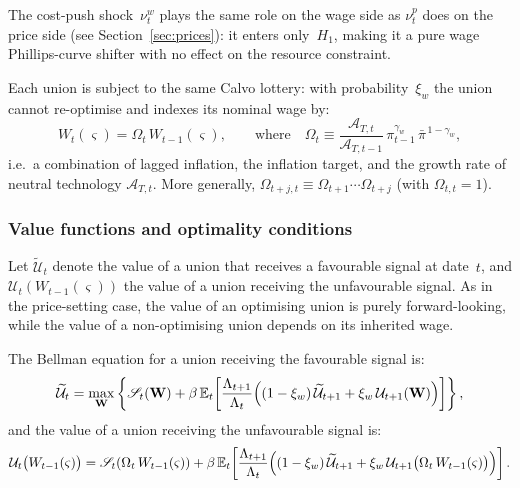 \documentclass[11pt,a4paper]{article}
\newcommand{\E}{\mathbb{E}}
\newcommand{\bbar}[1]{\bar{#1}}
\begin{document}
The cost-push shock~$\nu^w_t$ plays the same role on the wage side as
$\nu^p_t$ does on the price side (see Section~\ref{sec:prices}): it
enters only~$H_1$, making it a pure wage Phillips-curve shifter with no
effect on the resource constraint.

Each union is subject to the same Calvo lottery: with
probability~$\xi_w$ the union cannot re-optimise and indexes its nominal
wage by:
\begin{equation}\label{eq:wage_index_rule}
  W_t(\varsigma) = \Omega_t\,W_{t-1}(\varsigma),
  \qquad\text{where}\quad
  \Omega_t \equiv \frac{\mathcal{A}_{T,t}}{\mathcal{A}_{T,t-1}}\,
    \pi_{t-1}^{\gamma_w}\,\bbar\pi^{\,1-\gamma_w},
\end{equation}
i.e.\ a combination of lagged inflation, the inflation target, and the
growth rate of neutral technology $\mathcal{A}_{T,t}$. More generally,
$\Omega_{t+j,t} \equiv \Omega_{t+1}\cdots\Omega_{t+j}$ (with
$\Omega_{t,t}=1$).

\subsubsection{Value functions and optimality conditions}

Let $\widetilde{\mathcal{U}}_t$ denote the value of a union that
receives a favourable signal at date~$t$, and
$\mathcal{U}_t(W_{t-1}(\varsigma))$ the value of a union receiving the
unfavourable signal. As in the price-setting case, the value of an
optimising union is purely forward-looking, while the value of a
non-optimising union depends on its inherited wage.

The Bellman equation for a union receiving the favourable signal is:
\begin{equation}\label{eq:bellman_wage_fav}
  \widetilde{\mathcal{U}}_t
  = \max_{\mathbf{W}}\left\{
    \mathscr{S}_t(\mathbf{W})
    + \beta\,\E_t\!\left[\frac{\Lambda_{t+1}}{\Lambda_t}
      \Bigl((1-\xi_w)\,\widetilde{\mathcal{U}}_{t+1}
      + \xi_w\,\mathcal{U}_{t+1}(\mathbf{W})\Bigr)\right]
  \right\},
\end{equation}
and the value of a union receiving the unfavourable signal is:
\begin{equation}\label{eq:bellman_wage_unfav}
  \mathcal{U}_t\bigl(W_{t-1}(\varsigma)\bigr)
  = \mathscr{S}_t\!\left(\Omega_t\,W_{t-1}(\varsigma)\right)
  + \beta\,\E_t\!\left[\frac{\Lambda_{t+1}}{\Lambda_t}
    \Bigl((1-\xi_w)\,\widetilde{\mathcal{U}}_{t+1}
    + \xi_w\,\mathcal{U}_{t+1}\bigl(\Omega_t\,W_{t-1}(\varsigma)\bigr)
    \Bigr)\right].
\end{equation}
\end{document}
